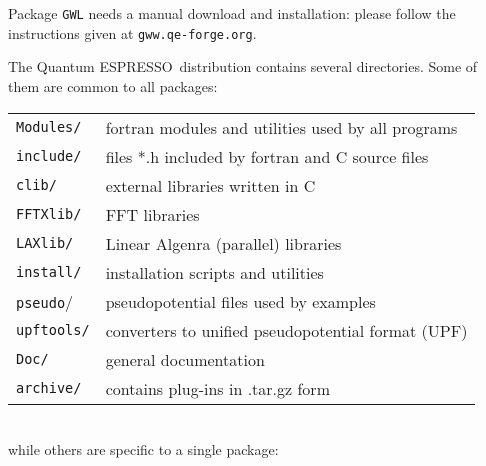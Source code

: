 \documentclass[12pt,a4paper]{article}
\def\qe{{\sc Quantum ESPRESSO}}
\begin{document}
Package \texttt{GWL} needs a manual download and installation:
please follow the instructions given at \texttt{gww.qe-forge.org}.




The \qe\ distribution contains several directories. Some of them are
common to all packages:

\begin{tabular}{ll}
\texttt{Modules/} &  fortran modules and utilities used by all programs\\
\texttt{include/} &  files *.h included by fortran and C source files\\
\texttt{clib/}    &  external libraries written in C\\
\texttt{FFTXlib/} &  FFT libraries\\
\texttt{LAXlib/}  &  Linear Algenra (parallel) libraries\\
\texttt{install/} &  installation scripts and utilities\\
\texttt{pseudo}/  &  pseudopotential files used by examples\\
\texttt{upftools/}&  converters to unified pseudopotential format (UPF)\\
\texttt{Doc/}     &  general documentation\\
\texttt{archive/} &  contains plug-ins in .tar.gz form\\
\end{tabular}
\\
while others are specific to a single package:
\end{document}
